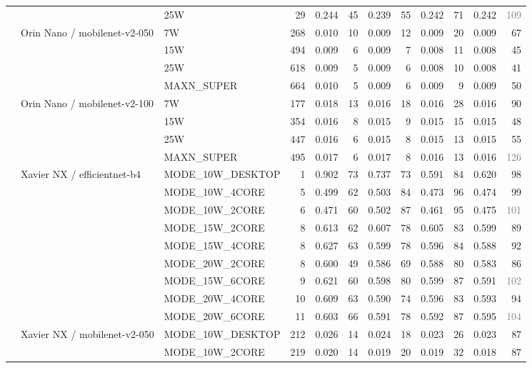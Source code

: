 \documentclass[10pt]{article}
\begin{document}
\begin{center}
\begin{longtable}{@{}lll r *{4}{r r}@{}}
 &  & 25W & 29 & 0.244 & 45 & 0.239 & 55 & 0.242 & 71 & 0.242 & \textcolor{gray}{109} \\
\addlinespace[2pt]
 & Orin Nano / mobilenet-v2-050 & 7W & 268 & 0.010 & 10 & 0.009 & 12 & 0.009 & 20 & 0.009 & 67 \\
 &  & 15W & 494 & 0.009 & 6 & 0.009 & 7 & 0.008 & 11 & 0.008 & 45 \\
 &  & 25W & 618 & 0.009 & 5 & 0.009 & 6 & 0.008 & 10 & 0.008 & 41 \\
 &  & MAXN\_SUPER & 664 & 0.010 & 5 & 0.009 & 6 & 0.009 & 9 & 0.009 & 50 \\
\addlinespace[2pt]
 & Orin Nano / mobilenet-v2-100 & 7W & 177 & 0.018 & 13 & 0.016 & 18 & 0.016 & 28 & 0.016 & 90 \\
 &  & 15W & 354 & 0.016 & 8 & 0.015 & 9 & 0.015 & 15 & 0.015 & 48 \\
 &  & 25W & 447 & 0.016 & 6 & 0.015 & 8 & 0.015 & 13 & 0.015 & 55 \\
 &  & MAXN\_SUPER & 495 & 0.017 & 6 & 0.017 & 8 & 0.016 & 13 & 0.016 & \textcolor{gray}{126} \\
\addlinespace[2pt]
 & Xavier NX / efficientnet-b4 & MODE\_10W\_DESKTOP & 1 & 0.902 & 73 & 0.737 & 73 & 0.591 & 84 & 0.620 & 98 \\
 &  & MODE\_10W\_4CORE & 5 & 0.499 & 62 & 0.503 & 84 & 0.473 & 96 & 0.474 & 99 \\
 &  & MODE\_10W\_2CORE & 6 & 0.471 & 60 & 0.502 & 87 & 0.461 & 95 & 0.475 & \textcolor{gray}{101} \\
 &  & MODE\_15W\_2CORE & 8 & 0.613 & 62 & 0.607 & 78 & 0.605 & 83 & 0.599 & 89 \\
 &  & MODE\_15W\_4CORE & 8 & 0.627 & 63 & 0.599 & 78 & 0.596 & 84 & 0.588 & 92 \\
 &  & MODE\_20W\_2CORE & 8 & 0.600 & 49 & 0.586 & 69 & 0.588 & 80 & 0.583 & 86 \\
 &  & MODE\_15W\_6CORE & 9 & 0.621 & 60 & 0.598 & 80 & 0.599 & 87 & 0.591 & \textcolor{gray}{102} \\
 &  & MODE\_20W\_4CORE & 10 & 0.609 & 63 & 0.590 & 74 & 0.596 & 83 & 0.593 & 94 \\
 &  & MODE\_20W\_6CORE & 11 & 0.603 & 66 & 0.591 & 78 & 0.592 & 87 & 0.595 & \textcolor{gray}{104} \\
\addlinespace[2pt]
 & Xavier NX / mobilenet-v2-050 & MODE\_10W\_DESKTOP & 212 & 0.026 & 14 & 0.024 & 18 & 0.023 & 26 & 0.023 & 87 \\
 &  & MODE\_10W\_2CORE & 219 & 0.020 & 14 & 0.019 & 20 & 0.019 & 32 & 0.018 & 87 \\

\end{longtable}
\end{center}
\end{document}
